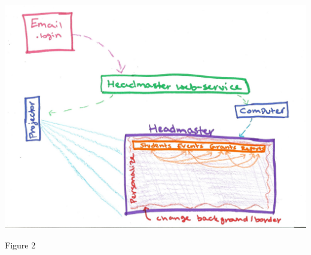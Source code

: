 \documentclass{article}
\begin{document}
\pagebreak

\includegraphics[scale=.50]{interfaceDesign.jpg}

Figure 2
\end{document}
